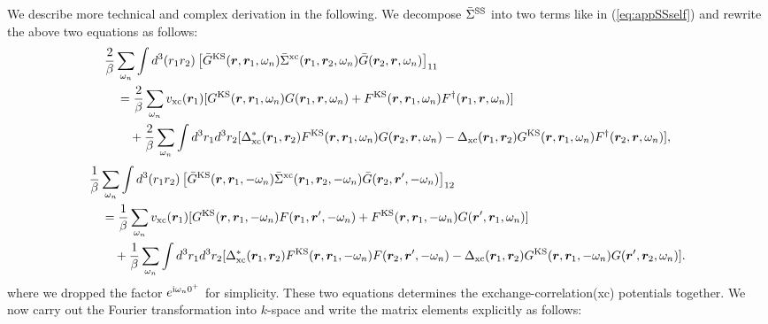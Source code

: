 We describe more technical and complex derivation in the following.
We decompose $\bar{\Sigma}^{\rm SS} $ into two terms like in (\ref{eq:appSSself}) and rewrite the 
above two equations as follows:
%
\begin{equation}
	\begin{split}
	& \frac{2}{\beta} \sum_{\omega_n}
	\int d^3(r_1 r_2) \left[ \bar{G}^{\rm KS}(\bm r, \bm r_1, \omega_n)
	\bar{\Sigma }^{\rm xc}(\bm r_1, \bm r_2, \omega_n) \bar{G}(\bm r_2, \bm r, \omega_n)
	\right]_{11} \\
	&\quad =
	\frac{2}{\beta}\sum_{\omega_n} 
	v_{\rm xc}(\bm r_1) [G^{\rm KS}(\bm r,\bm r_1,\omega_n)G(\bm r_1, \bm r, \omega_n)+
	F^{\rm KS}(\bm r, \bm r_1, \omega_n)F^{\dag}(\bm r_1, \bm r, \omega_n)] \\
	&\quad \quad + 
	\frac{2}{\beta}\sum_{\omega_n}
	\int d^3r_1 d^3r_2 
	[\Delta_{\rm xc}^{\ast}(\bm r_1, \bm r_2)
	F^{\rm KS}(\bm r,\bm r_1, \omega_n)G(\bm r_2, \bm r, \omega_n) 
	- \Delta_{\rm xc}(\bm r_1, \bm r_2)
	G^{\rm KS}(\bm r,\bm r_1, \omega_n)F^{\dag}(\bm r_2, \bm r, \omega_n) 
	],
	\label{eq:11comp1}
\end{split}
\end{equation}
%
\begin{equation}
	\begin{split}
	& \frac{1}{\beta} \sum_{\omega_n}
	\int d^3(r_1 r_2) \left[ \bar{G}^{\rm KS}(\bm r, \bm r_1, -\omega_n)
	\bar{\Sigma }^{\rm xc}(\bm r_1, \bm r_2, -\omega_n) \bar{G}(\bm r_2, \bm r', -\omega_n)
	\right]_{12} \\
	&\quad =
	\frac{1}{\beta}\sum_{\omega_n} 
	v_{\rm xc}(\bm r_1) [G^{\rm KS}(\bm r,\bm r_1,-\omega_n)F(\bm r_1, \bm r', -\omega_n)+
	F^{\rm KS}(\bm r, \bm r_1, -\omega_n)G(\bm r', \bm r_1, \omega_n)] \\
	&\quad \quad + 
	\frac{1}{\beta}\sum_{\omega_n}
	\int d^3r_1 d^3r_2 
	[\Delta_{\rm xc}^{\ast}(\bm r_1, \bm r_2)
	F^{\rm KS}(\bm r,\bm r_1, -\omega_n)F(\bm r_2, \bm r', -\omega_n) 
	- \Delta_{\rm xc}(\bm r_1, \bm r_2)
	G^{\rm KS}(\bm r,\bm r_1, -\omega_n)G(\bm r', \bm r_2, \omega_n) 
	].
	\label{eq:12comp1}
\end{split}
\end{equation}
%
where we dropped the factor $e^{ {\rm i}\omega_n0^{+}}$ for simplicity. 
These two equations determines the exchange-correlation(xc) potentials together.
We now carry out the Fourier transformation into $k$-space and write the matrix elements explicitly
as follows:
%
